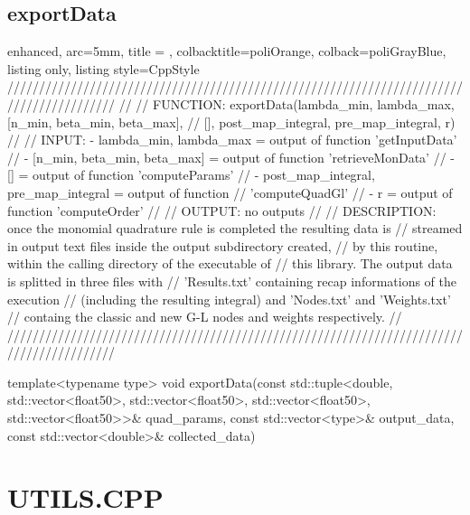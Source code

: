 \documentclass[a4paper, twosided]{book}
\begin{document}
\subsection[exportData]{\changefont exportData}\label{SubSec4.2.6}

\begin{tcblisting}{enhanced,
                   arc=5mm,
                   title = \color{black}{\large \ttfamily DatIo.cpp/exportData},
                   colbacktitle=poliOrange,
                   colback=poliGrayBlue,
                   listing only,
                   listing style=CppStyle}
/////////////////////////////////////////////////////////////////////////////////////////
//
//       FUNCTION: exportData({lambda_min, lambda_max}, [n_min, {beta_min, beta_max}],
//                            [], {post_map_integral, pre_map_integral}, r)
//                
//          INPUT: - {lambda_min, lambda_max} = output of function 'getInputData'
//                 - [n_min, {beta_min, beta_max}] = output of function 'retrieveMonData'
//                 - [] = output of function 'computeParams'
//                 - {post_map_integral, pre_map_integral} = output of function
//                                                           'computeQuadGl'
//                 - r = output of function 'computeOrder'
//
//         OUTPUT: no outputs
//
//    DESCRIPTION: once the monomial quadrature rule is completed the resulting data is
//                 streamed in output text files inside the output subdirectory created,
//                 by this routine, within the calling directory of the executable of 
//                 this library. The output data is splitted in three files with
//                 'Results.txt' containing recap informations of the execution 
//                 (including the resulting integral) and 'Nodes.txt' and 'Weights.txt'
//                 containg the classic and new G-L nodes and weights respectively.
//
/////////////////////////////////////////////////////////////////////////////////////////

template<typename type>
void exportData(const std::tuple<double, std::vector<float50>, std::vector<float50>, std::vector<float50>, std::vector<float50>>& quad_params, const std::vector<type>& output_data, const std::vector<double>& collected_data)
\end{tcblisting}

\newpage

\section[Utils.cpp]{\changefont UTILS.CPP}\label{Sec4.3}
\end{document}
